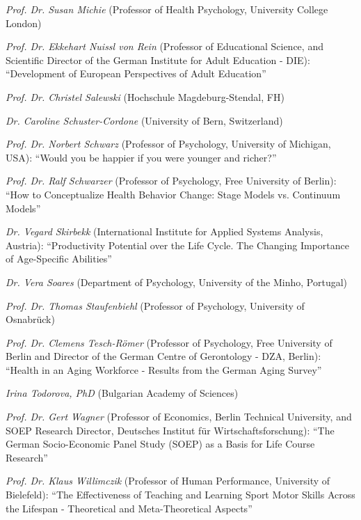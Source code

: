 \textit{Prof. Dr. Susan Michie} (Professor of Health Psychology, University College London)


\textit{Prof. Dr. Ekkehart Nuissl von Rein} (Professor of Educational Science, and Scientific Director of the German Institute for Adult Education - DIE): ``Development of European Perspectives of Adult Education''


\textit{Prof. Dr. Christel Salewski} (Hochschule Magdeburg-Stendal, FH)


\textit{Dr. Caroline Schuster-Cordone} (University of Bern, Switzerland)


\textit{Prof. Dr. Norbert Schwarz} (Professor of Psychology, University of Michigan, USA): ``Would you be happier if you were younger and richer?''


\textit{Prof. Dr. Ralf Schwarzer} (Professor of Psychology, Free University of Berlin): ``How to Conceptualize Health Behavior Change: Stage Models vs. Continuum Models''


\textit{Dr. Vegard Skirbekk} (International Institute for Applied Systems Analysis, Austria): ``Productivity Potential over the Life Cycle. The Changing Importance of Age-Specific Abilities'' 


\textit{Dr. Vera Soares} (Department of Psychology, University of the Minho, Portugal)


\textit{Prof. Dr. Thomas Staufenbiehl} (Professor of Psychology, University of Osnabr\"uck)


\textit{Prof. Dr. Clemens Tesch-R\"omer} (Professor of Psychology, Free University of Berlin and Director of the German Centre of Gerontology - DZA, Berlin): ``Health in an Aging Workforce - Results from the German Aging Survey''


\textit{Irina Todorova, PhD} (Bulgarian Academy of Sciences)


\textit{Prof. Dr. Gert Wagner} (Professor of Economics, Berlin Technical University, and SOEP Research Director, Deutsches Institut f\"ur Wirtschaftsforschung): ``The German Socio-Economic Panel Study (SOEP) as a Basis for Life Course Research''


\textit{Prof. Dr. Klaus Willimczik} (Professor of Human Performance, University of Bielefeld): ``The Effectiveness of Teaching and Learning Sport Motor Skills Across the Lifespan - Theoretical and Meta-Theoretical Aspects''

